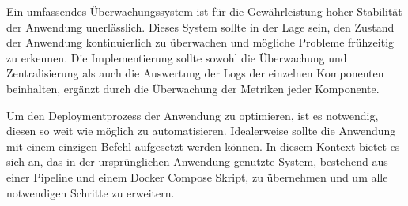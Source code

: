 Ein umfassendes Überwachungssystem ist für die Gewährleistung hoher Stabilität der Anwendung unerlässlich. Dieses System sollte in der Lage sein, den Zustand der Anwendung kontinuierlich zu überwachen und 
mögliche Probleme frühzeitig zu erkennen. Die Implementierung sollte sowohl die Überwachung und Zentralisierung als auch die Auswertung der Logs der einzelnen Komponenten beinhalten, ergänzt durch die Überwachung der Metriken jeder Komponente.

Um den Deploymentprozess der Anwendung zu optimieren, ist es notwendig, diesen so weit wie möglich zu automatisieren. Idealerweise sollte die Anwendung mit einem einzigen Befehl aufgesetzt werden können. 
In diesem Kontext bietet es sich an, das in der ursprünglichen Anwendung genutzte System, bestehend aus einer Pipeline und einem Docker Compose Skript, zu übernehmen und um alle notwendigen Schritte zu erweitern.